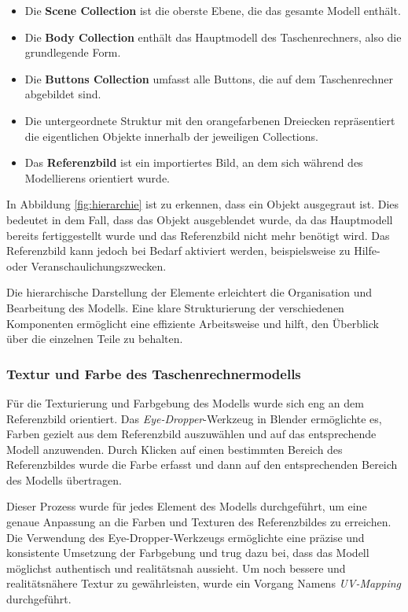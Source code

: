 \begin{itemize}
    \item Die \textbf{Scene Collection} ist die oberste Ebene, die das gesamte Modell enthält.
    \item Die \textbf{Body Collection} enthält das Hauptmodell des Taschenrechners, also die grundlegende Form.
    \item Die \textbf{Buttons Collection} umfasst alle Buttons, die auf dem Taschenrechner abgebildet sind.
    \item Die untergeordnete Struktur mit den orangefarbenen Dreiecken repräsentiert die eigentlichen Objekte innerhalb der jeweiligen Collections.
    \item Das \textbf{Referenzbild} ist ein importiertes Bild, an dem sich während des Modellierens orientiert wurde.
\end{itemize}

In Abbildung \ref{fig:hierarchie} ist zu erkennen, dass ein Objekt ausgegraut ist. Dies bedeutet in dem Fall, dass das
Objekt ausgeblendet wurde, da das Hauptmodell bereits fertiggestellt wurde und das Referenzbild nicht mehr benötigt wird.
Das Referenzbild kann jedoch bei Bedarf aktiviert werden, beispielsweise zu Hilfe- oder Veranschaulichungszwecken.

Die hierarchische Darstellung der Elemente erleichtert die Organisation und Bearbeitung des Modells. Eine klare
Strukturierung der verschiedenen Komponenten ermöglicht eine effiziente Arbeitsweise und hilft, den Überblick über die
einzelnen Teile zu behalten.

\subsubsection*{Textur und Farbe des Taschenrechnermodells}
Für die Texturierung und Farbgebung des Modells wurde sich eng an dem Referenzbild orientiert.
Das \textit{Eye-Dropper}-Werkzeug in Blender ermöglichte es, Farben gezielt aus dem Referenzbild auszuwählen und auf das
entsprechende Modell anzuwenden. Durch Klicken auf einen bestimmten Bereich des Referenzbildes wurde die Farbe erfasst
und dann auf den entsprechenden Bereich des Modells übertragen.

Dieser Prozess wurde für jedes Element des Modells durchgeführt, um eine genaue Anpassung an die Farben und Texturen des
Referenzbildes zu erreichen. Die Verwendung des Eye-Dropper-Werkzeugs ermöglichte eine präzise und konsistente Umsetzung
der Farbgebung und trug dazu bei, dass das Modell möglichst authentisch und realitätsnah aussieht. Um noch bessere und
realitätsnähere Textur zu gewährleisten, wurde ein Vorgang Namens \textit{UV-Mapping} durchgeführt.

